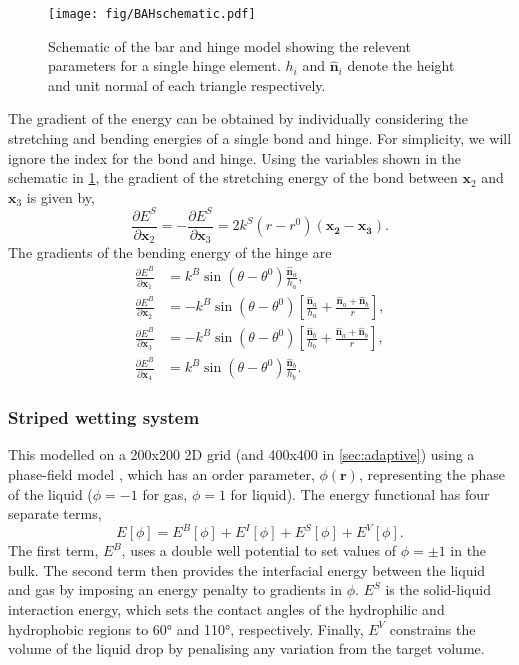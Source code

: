 \documentclass[twocolumn,10pt]{revtex4}
\begin{document}
\begin{figure}[htb]
  \texttt{[image: fig/BAHschematic.pdf]}
  \caption{\label{fig:BAHschematic}
    Schematic of the bar and hinge model showing the relevent parameters for a single hinge element. $h_i$ and $\bm{\hat{n}}_i$ denote the height and unit normal of each triangle respectively.
  }
\end{figure}
The gradient of the energy can be obtained by individually considering the stretching and bending energies of a single bond and hinge.
For simplicity, we will ignore the index for the bond and hinge.
Using the variables shown in the schematic in \cref{fig:BAHschematic}, the gradient of the stretching energy of the bond between $\bm{x}_2$ and $\bm{x}_3$ is given by,
\begin{equation}
  \frac{\partial E^S}{\partial \bm{x}_2} = - \frac{\partial E^S}{\partial \bm{x}_3} = 
    2 k^S (r - r^0) (\bm{x_2} - \bm{x_3}).
\end{equation}
The gradients of the bending energy of the hinge are
\begin{align}
  \frac{\partial E^B}{\partial \bm{x}_1} &= k^B \sin(\theta - \theta^0) \frac{\bm{\hat{n}}_a}{h_a}, \\
  \frac{\partial E^B}{\partial \bm{x}_2} &= - k^B \sin(\theta - \theta^0) \left[\frac{\bm{\hat{n}}_a}{h_a} + \frac{\bm{\hat{n}}_a + \bm{\hat{n}}_b}{r}\right], \\
  \frac{\partial E^B}{\partial \bm{x}_3} &= - k^B \sin(\theta - \theta^0) \left[\frac{\bm{\hat{n}}_b}{h_b} + \frac{\bm{\hat{n}}_a + \bm{\hat{n}}_b}{r}\right], \\
  \frac{\partial E^B}{\partial \bm{x}_4} &= k^B \sin(\theta - \theta^0) \frac{\bm{\hat{n}}_b}{h_b}.
\end{align}

\subsubsection{Striped wetting system}
This modelled on a 200x200 2D grid (and 400x400 in \cref{sec:adaptive}) using a phase-field model \cite{Panter2019b}, which has an order parameter, $\phi(\bm{r})$, representing the phase of the liquid ($\phi=-1$ for gas, $\phi=1$ for liquid).
The energy functional has four separate terms,
\begin{equation} \label{eq:phasefield}
  E[\phi] = E^B[\phi] + E^I[\phi] + E^S[\phi] + E^V[\phi].
\end{equation}
The first term, $E^B$, uses a double well potential to set values of $\phi=\pm1$ in the bulk.
The second term then provides the interfacial energy between the liquid and gas by imposing an energy penalty to gradients in $\phi$.
$E^S$ is the solid-liquid interaction energy, which sets the contact angles of the hydrophilic and hydrophobic regions to 60\si{\degree} and 110\si{\degree}, respectively.
Finally, $E^V$ constrains the volume of the liquid drop by penalising any variation from the target volume.
\end{document}
